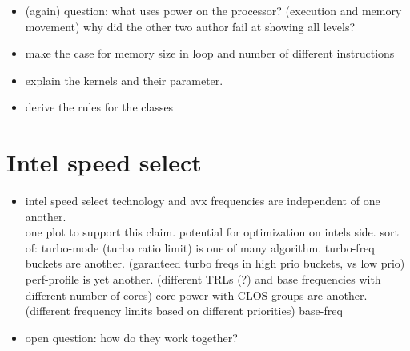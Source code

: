 

\begin{itemize}
    \item (again) question: what uses power on the processor? (execution and memory movement)
    why did the other two author fail at showing all levels?
    \item make the case for memory size in loop and number of different instructions
    \item explain the kernels and their parameter.
    \item derive the rules for the classes
\end{itemize}



\section{Intel speed select}
\label{sec:isst}

\begin{itemize}
    \item intel speed select technology and avx frequencies are independent of one another.\\
    one plot to support this claim. potential for optimization on intels side.
    sort of: turbo-mode (turbo ratio limit) is one of many algorithm.
    turbo-freq buckets are another. (garanteed turbo freqs in high prio buckets, vs low prio)
    perf-profile is yet another. (different TRLs (?) and base frequencies with different number of cores)
    core-power with CLOS groups are another. (different frequency limits based on different priorities)
    base-freq
    \item open question: how do they work together?
\end{itemize}


